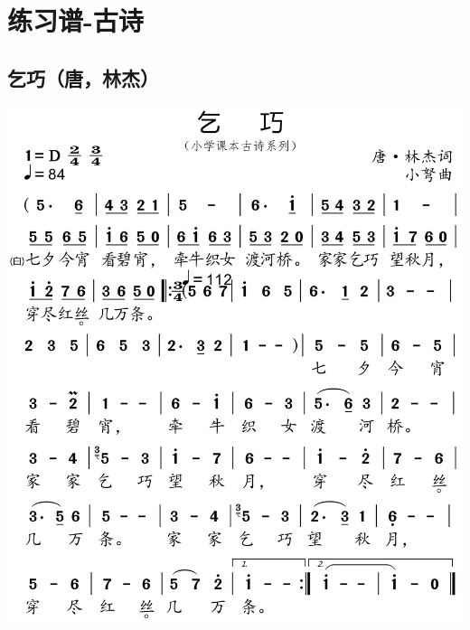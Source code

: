 \documentclass[cn,pad,chinesefont=nofont,twocol]{elegantbook}
\begin{document}
\chapter{练习谱-古诗}
\section{乞巧（唐，林杰）}
    \includegraphics[width=\textwidth]{dongxiao/20200627-古诗-乞巧.jpg}     
\end{document}
